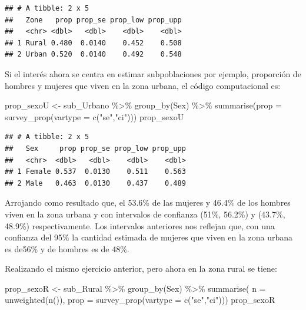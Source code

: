 \documentclass[
  12pt,
]{book}
\newenvironment{Shaded}{\begin{snugshade}}{\end{snugshade}}
\newcommand{\AttributeTok}[1]{\textcolor[rgb]{0.77,0.63,0.00}{#1}}
\newcommand{\FunctionTok}[1]{\textcolor[rgb]{0.00,0.00,0.00}{#1}}
\newcommand{\NormalTok}[1]{#1}
\newcommand{\OtherTok}[1]{\textcolor[rgb]{0.56,0.35,0.01}{#1}}
\newcommand{\SpecialCharTok}[1]{\textcolor[rgb]{0.00,0.00,0.00}{#1}}
\newcommand{\StringTok}[1]{\textcolor[rgb]{0.31,0.60,0.02}{#1}}
\begin{document}
\begin{verbatim}
## # A tibble: 2 x 5
##   Zone   prop prop_se prop_low prop_upp
##   <chr> <dbl>   <dbl>    <dbl>    <dbl>
## 1 Rural 0.480  0.0140    0.452    0.508
## 2 Urban 0.520  0.0140    0.492    0.548
\end{verbatim}

Si el interés ahora se centra en estimar subpoblaciones por ejemplo, proporción de hombres y mujeres que viven en la zona urbana, el código computacional es:

\begin{Shaded}
\begin{Highlighting}[]
\NormalTok{prop\_sexoU }\OtherTok{\textless{}{-}}\NormalTok{ sub\_Urbano }\SpecialCharTok{\%\textgreater{}\%} \FunctionTok{group\_by}\NormalTok{(Sex) }\SpecialCharTok{\%\textgreater{}\%} 
              \FunctionTok{summarise}\NormalTok{(}\AttributeTok{prop =} \FunctionTok{survey\_prop}\NormalTok{(}\AttributeTok{vartype =} \FunctionTok{c}\NormalTok{(}\StringTok{"se"}\NormalTok{,}\StringTok{"ci"}\NormalTok{)))}
\NormalTok{prop\_sexoU}
\end{Highlighting}
\end{Shaded}

\begin{verbatim}
## # A tibble: 2 x 5
##   Sex     prop prop_se prop_low prop_upp
##   <chr>  <dbl>   <dbl>    <dbl>    <dbl>
## 1 Female 0.537  0.0130    0.511    0.563
## 2 Male   0.463  0.0130    0.437    0.489
\end{verbatim}

Arrojando como resultado que, el 53.6\% de las mujeres y 46.4\% de los hombres viven en la zona urbana y con intervalos de confianza (51\%, 56.2\%) y (43.7\%, 48.9\%) respectivamente. Los intervalos anteriores nos reflejan que, con una confianza del 95\% la cantidad estimada de mujeres que viven en la zona urbana es de56\% y de hombres es de 48\%.

Realizando el mismo ejercicio anterior, pero ahora en la zona rural se tiene:

\begin{Shaded}
\begin{Highlighting}[]
\NormalTok{prop\_sexoR }\OtherTok{\textless{}{-}}\NormalTok{ sub\_Rural }\SpecialCharTok{\%\textgreater{}\%} \FunctionTok{group\_by}\NormalTok{(Sex) }\SpecialCharTok{\%\textgreater{}\%} 
              \FunctionTok{summarise}\NormalTok{( }\AttributeTok{n =} \FunctionTok{unweighted}\NormalTok{(}\FunctionTok{n}\NormalTok{()),}
                         \AttributeTok{prop =} \FunctionTok{survey\_prop}\NormalTok{(}\AttributeTok{vartype =} \FunctionTok{c}\NormalTok{(}\StringTok{"se"}\NormalTok{,}\StringTok{"ci"}\NormalTok{)))}
\NormalTok{prop\_sexoR}
\end{Highlighting}
\end{Shaded}
\end{document}

